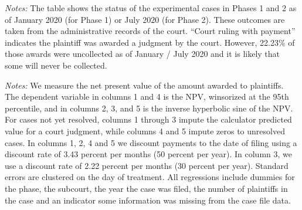 \documentclass[11pt, a4paper]{article}
\begin{document}
\begin{table}[!ht]
    \caption{Case outcomes by treatment arm}
    \label{LR_outcomes}
    \begin{center}
    \scriptsize{}
    \end{center}
     \scriptsize

\textit{Notes:} The table shows the status of the experimental cases in Phases 1 and 2 as of January 2020 (for Phase 1) or July 2020 (for Phase 2). These outcomes are taken from the administrative records of the court. ``Court ruling with payment'' indicates the plaintiff was awarded a judgment by the court. However, 22.23\% of those awards were uncollected as of January / July 2020 and it is likely that some will never be collected.
\end{table}


\begin{table}[!ht]
    \caption{Recovery after 42 months, Phase 1/2 samples}
    \label{2020followup}
    \begin{center}
    \scriptsize{}
    \end{center}
  \scriptsize
 \textit{Notes:}   We measure the net present value of the amount awarded to plaintiffs. The dependent variable in columns 1 and 4 is the NPV, winsorized at the 95th percentile, and in columns 2, 3, and 5 is the inverse hyperbolic sine of the NPV. For cases not yet resolved, columns 1 through 3 impute the calculator predicted value for a court judgment, while  columns 4 and 5 impute zeros to unresolved cases. In columns 1, 2, 4 and 5 we discount payments to the date of filing using a discount rate of 3.43 percent per months (50 percent per year). In column 3, we use a discount rate of 2.22 percent per months (30 percent per year). Standard errors are clustered on the day of treatment. All regressions include dummies for the phase, the subcourt, the year the case was filed, the number of plaintiffs in the case and an indicator some information was missing from the case file data. 
 

\end{table}
\end{document}

